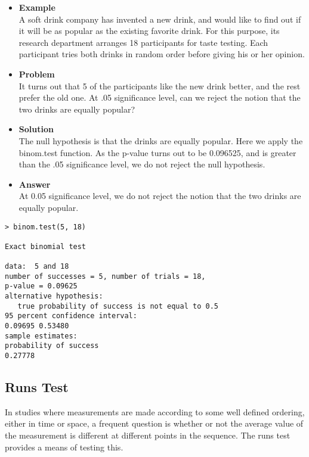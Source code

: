 \documentclass[12pt, a4paper]{report}
\theoremstyle{plain}
\theoremstyle{definition}
\theoremstyle{remark}
\begin{document}
\begin{itemize}
\item \textbf{Example}\\
A soft drink company has invented a new drink, and would like to find out if it will be as popular as the existing favorite drink. For this purpose, its research department arranges 18 participants for taste testing. Each participant tries both drinks in random order before giving his or her opinion.

\item \textbf{Problem}\\
It turns out that 5 of the participants like the new drink better, and the rest prefer the old one. At .05 significance level, can we reject the notion that the two drinks are equally popular?

\item \textbf{Solution} \\
The null hypothesis is that the drinks are equally popular. Here we apply the binom.test function. As the p-value turns out to be 0.096525, and is greater than the .05 significance level, we do not reject the null hypothesis.
\item \textbf{Answer}\\
At 0.05 significance level, we do not reject the notion that the two drinks are equally popular.
\end{itemize}
\begin{framed}
\begin{verbatim}
> binom.test(5, 18) 

Exact binomial test 

data:  5 and 18 
number of successes = 5, number of trials = 18, 
p-value = 0.09625 
alternative hypothesis: 
   true probability of success is not equal to 0.5 
95 percent confidence interval: 
0.09695 0.53480 
sample estimates: 
probability of success 
0.27778
\end{verbatim}
\end{framed}

\newpage
\subsection*{Runs Test}
In studies where measurements are made according to some well defined ordering, either in time or
space, a frequent question is whether or not the average value of the measurement is different at
different points in the sequence. The runs test provides a means of testing this.
\end{document}
